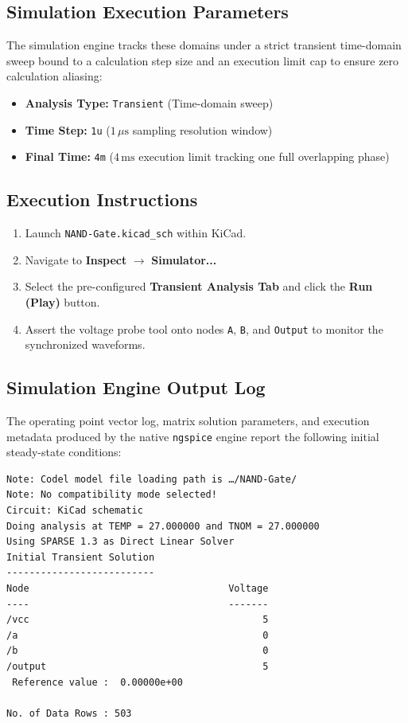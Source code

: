 \documentclass[11pt,letterpaper]{article}
\begin{document}
\subsection{Simulation Execution Parameters}
The simulation engine tracks these domains under a strict transient time-domain sweep bound to a calculation step size and an execution limit cap to ensure zero calculation aliasing:
\begin{itemize}
    \item \textbf{Analysis Type:} \texttt{Transient} (Time-domain sweep)
    \item \textbf{Time Step:} \texttt{1u} ($1\,\mu\text{s}$ sampling resolution window)
    \item \textbf{Final Time:} \texttt{4m} ($4\,\text{ms}$ execution limit tracking one full overlapping phase)
\end{itemize}

\subsection{Execution Instructions}
\begin{enumerate}
    \item Launch \texttt{NAND-Gate.kicad\_sch} within KiCad.
    \item Navigate to \textbf{Inspect} $\rightarrow$ \textbf{Simulator...}
    \item Select the pre-configured \textbf{Transient Analysis Tab} and click the \textbf{Run (Play)} button.
    \item Assert the voltage probe tool onto nodes \texttt{A}, \texttt{B}, and \texttt{Output} to monitor the synchronized waveforms.
\end{enumerate}

\subsection{Simulation Engine Output Log}
The operating point vector log, matrix solution parameters, and execution metadata produced by the native \texttt{ngspice} engine report the following initial steady-state conditions:

\begin{verbatim}
Note: Codel model file loading path is …/NAND-Gate/
Note: No compatibility mode selected!
Circuit: KiCad schematic
Doing analysis at TEMP = 27.000000 and TNOM = 27.000000
Using SPARSE 1.3 as Direct Linear Solver
Initial Transient Solution
--------------------------
Node                                   Voltage
----                                   -------
/vcc                                         5
/a                                           0
/b                                           0
/output                                      5
 Reference value :  0.00000e+00

No. of Data Rows : 503
\end{verbatim}
\end{document}
